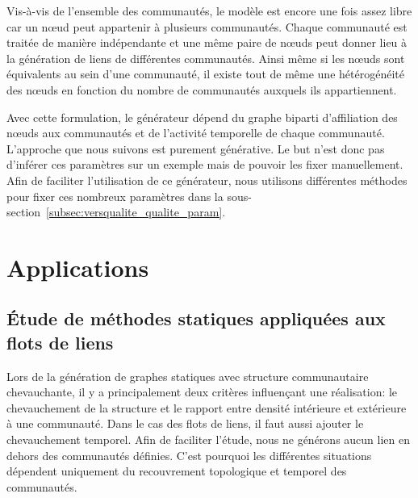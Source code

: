 Vis-à-vis de l'ensemble des communautés, le modèle est encore une fois assez libre car un n\oe{}ud peut appartenir à plusieurs communautés.
Chaque communauté est traitée de manière indépendante et une même paire de n\oe{}uds peut donner lieu à la génération de liens de différentes communautés.
Ainsi même si les n\oe{}uds sont équivalents au sein d'une communauté, il existe tout de même une hétérogénéité des n\oe{}uds en fonction du nombre de communautés auxquels ils appartiennent.

\bigskip

Avec cette formulation, le générateur dépend du graphe biparti d'affiliation des n\oe{}uds aux communautés et de l'activité temporelle de chaque communauté.
L'approche que nous suivons est purement générative.
Le but n'est donc pas d'inférer ces paramètres sur un exemple mais de pouvoir les fixer manuellement.
Afin de faciliter l'utilisation de ce générateur, nous utilisons différentes méthodes pour fixer ces nombreux paramètres dans la sous-section~\ref{subsec:versqualite_qualite_param}.


\section{Applications}
\label{sec:versqualite_Applications}


%



\subsection{Étude de méthodes statiques appliquées aux flots de liens}
\label{sec:versqualite_statique}

Lors de la génération de graphes statiques avec structure communautaire chevauchante, il y a principalement deux critères influençant une réalisation: le chevauchement de la structure et le rapport entre densité intérieure et extérieure à une communauté.
Dans le cas des flots de liens, il faut aussi ajouter le chevauchement temporel.
Afin de faciliter l'étude, nous ne générons aucun lien en dehors des communautés définies.
C'est pourquoi les différentes situations dépendent uniquement du recouvrement topologique et temporel des communautés.
 
